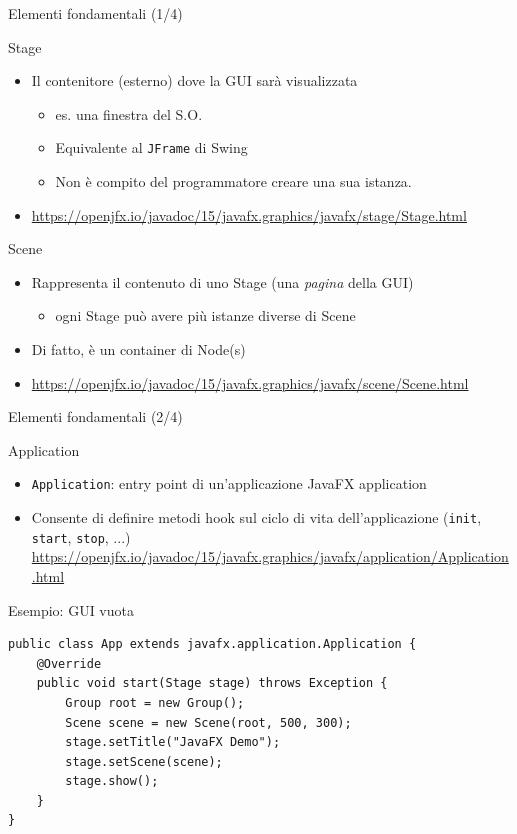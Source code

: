 \documentclass[xcolor=dvipsnames,presentation]{beamer}
\begin{document}
\begin{frame}{Elementi fondamentali (1/4)}
\begin{block}{Stage}
\begin{itemize}
\item Il contenitore (esterno) dove la GUI sarà visualizzata
\begin{itemize}
\item es. una finestra del S.O.
\item Equivalente al \texttt{JFrame} di Swing
\item Non è compito del programmatore creare una sua istanza.
\end{itemize}
\item \url{https://openjfx.io/javadoc/15/javafx.graphics/javafx/stage/Stage.html}
\end{itemize}
\end{block}

\begin{block}{Scene}
\begin{itemize}
\item Rappresenta il contenuto di uno Stage (una \emph{pagina} della GUI)
\begin{itemize}
\item ogni Stage può avere più istanze diverse di Scene
\end{itemize}
\item Di fatto, è un container di Node(s)
\item \url{https://openjfx.io/javadoc/15/javafx.graphics/javafx/scene/Scene.html}
\end{itemize}
\end{block}
\end{frame}

\begin{frame}[fragile]{Elementi fondamentali (2/4)}

\begin{block}{Application}
\begin{itemize}
\item \texttt{Application}: entry point di un'applicazione JavaFX application
\item Consente di definire metodi hook sul ciclo di vita dell'applicazione (\texttt{init}, \texttt{start}, \texttt{stop}, ...)
\\ \url{https://openjfx.io/javadoc/15/javafx.graphics/javafx/application/Application.html}
\end{itemize}
\end{block}

Esempio: GUI vuota

\begin{lstlisting}
public class App extends javafx.application.Application {
	@Override
	public void start(Stage stage) throws Exception {
		Group root = new Group();
		Scene scene = new Scene(root, 500, 300);
		stage.setTitle("JavaFX Demo");
		stage.setScene(scene);
		stage.show();
	}
}
\end{lstlisting}
\end{frame}
\end{document}
